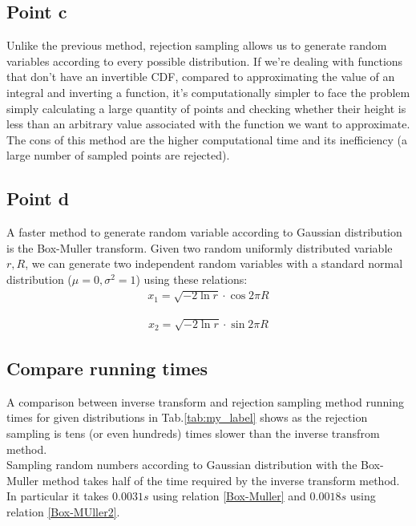 \documentclass{article}
\begin{document}
\subsection{Point c}
Unlike the previous method, rejection sampling allows us to generate random variables according to every possible distribution. If we're dealing with functions that don't have an invertible CDF, compared to approximating the value of an integral and inverting a function, it's computationally simpler to face the problem simply calculating a large quantity of points and checking whether their height is less than an arbitrary value associated with the function we want to approximate. \\
The cons of this method are the higher computational time and its inefficiency (a large number of sampled points are rejected).

\subsection{Point d}
A faster method to generate random variable according to Gaussian distribution is the Box-Muller transform. Given two random uniformly distributed variable $r,R$, we can generate two independent random variables with a standard normal distribution ($\mu=0, \sigma^2=1$) using these relations:
\begin{align}
    x_1=\sqrt{-2\ln{r}}\cdot \cos{2\pi R}
    \label{Box-Muller}
\end{align}

\begin{align}
    x_2=\sqrt{-2\ln{r}}\cdot \sin{2\pi R}
    \label{Box-MUller2}
\end{align}

\subsection*{Compare running times}
 A comparison between inverse transform and rejection sampling method running times for given distributions in Tab.\ref{tab:my_label} shows as the rejection sampling is tens (or even hundreds) times slower than the inverse transfrom method. \\
Sampling random numbers according to Gaussian distribution with the Box-Muller method takes half of the time required by the inverse transform method. In particular it takes $0.0031 s$ using relation \ref{Box-Muller} and $0.0018 s$ using relation \ref{Box-MUller2}.
\end{document}

